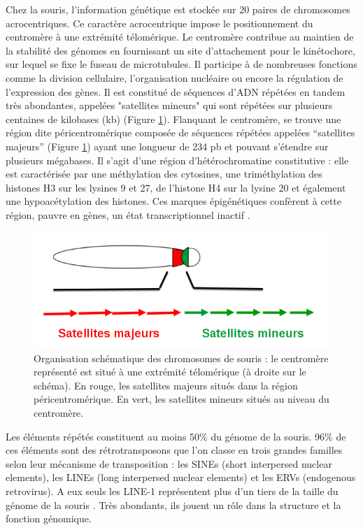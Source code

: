 \documentclass[a4paper,12pt,times]{report}
\newcommand{\scaption}[1]{\caption{\footnotesize{#1}}}
\begin{document}
\bigskip%
Chez la souris, l'information génétique est stockée sur 20 paires de chromosomes acrocentriques. Ce caractère acrocentrique impose le positionnement du centromère à une extrémité télomérique. 
Le centromère contribue au maintien de la stabilité des génomes en fournissant un site d’attachement pour le kinétochore, sur lequel se fixe le fuseau de microtubules. Il participe à de nombreuses fonctions comme la division cellulaire, l’organisation nucléaire ou encore la régulation de l’expression des gènes.
Il est  constitué de séquences d’ADN répétées en tandem très abondantes, appelées "satellites mineurs" qui sont  répétées sur plusieurs centaines de kilobases (kb) (Figure \ref{tandem}).
\newline Flanquant le centromère, se trouve une région dite péricentromérique composée de séquences répétées appelées ``satellites majeurs''  (Figure \ref{tandem}) ayant une longueur de 234 pb et pouvant s'étendre sur plusieurs mégabases.
Il s'agit d'une région d'hétérochromatine constitutive : elle est caractérisée par une méthylation des cytosines, une triméthylation des histones H3 sur les lysines 9 et 27, de l'histone H4 sur la lysine 20 et également une hypoacétylation des histones. Ces marques épigénétiques confèrent à cette région, pauvre en gènes, un état transcriptionnel inactif \cite{introsouris}.

\begin{figure}[!ht]
\centering
\includegraphics[scale=0.6]{tandem.png}
\scaption{Organisation schématique des chromosomes de souris : le centromère représenté est situé à une extrémité télomérique (à droite sur le schéma). En rouge, les satellites majeurs situés dans la région péricentromérique. En vert, les satellites mineurs situés au niveau du centromère.}
\label{tandem}
\end{figure}

\newpage
Les éléments répétés constituent au moins 50\% du génome de la souris. 
96\% de ces éléments sont des rétrotransposons \cite{transposables} que l'on classe en trois grandes familles selon leur mécanisme de transposition : les SINEs (short interpersed nuclear elements), les LINEs (long interpersed nuclear elements) et les ERVs (endogenous retrovirus). A eux seuls les LINE-1 représentent plus d'un tiers de la taille du génome de la souris \cite{pmid23945931}. Très abondants, ils jouent un rôle dans la structure et la fonction génomique.
\end{document}
